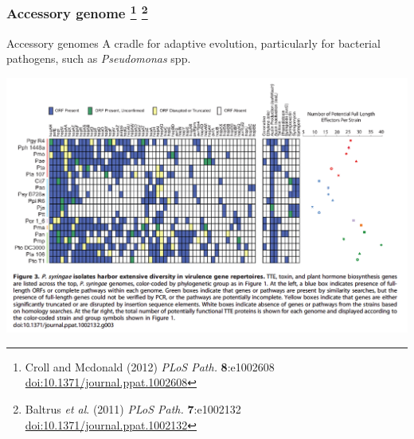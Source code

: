 \begin{frame}
  \frametitle{Accessory genome
   \footnote{\tiny{Croll and Mcdonald (2012) \textit{PLoS Path.} \textbf{8}:e1002608 \href{http://dx.doi.org/10.1371/journal.ppat.1002608}{doi:10.1371/journal.ppat.1002608}}}
    \footnote{\tiny{Baltrus \textit{et al}. (2011) \textit{PLoS Path.} \textbf{7}:e1002132 \href{http://dx.doi.org/10.1371/journal.ppat.1002132}{doi:10.1371/journal.ppat.1002132}}}  
  }
  \begin{block}{Accessory genomes}
    A cradle for adaptive evolution, particularly for bacterial pathogens, such as \textit{Pseudomonas} spp.
  \end{block}
  \begin{center}
      \includegraphics[height=0.45\textheight]{images/pa_virulence} 
  \end{center}
\end{frame}
